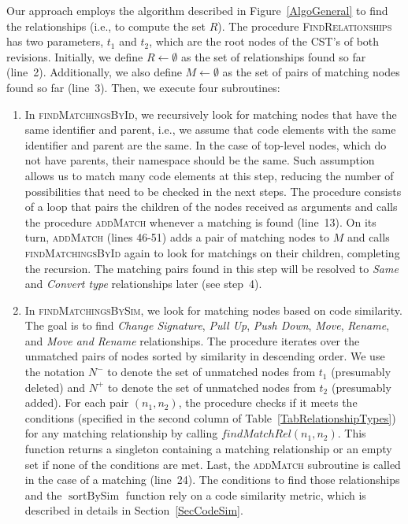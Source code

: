 \documentclass[10pt,journal,compsoc]{IEEEtran}
\DeclareMathOperator{\rdsortbysim}{sortBySim}
\begin{document}
Our approach employs the algorithm described in Figure~\ref{AlgoGeneral} to find the relationships (i.e., to compute the set $R$).
The procedure \textsc{FindRelationships} has two parameters, $t_1$ and $t_2$, which are the root nodes of the CST's of both revisions.
Initially, we define $R \gets \emptyset$ as the set of relationships found so far (line~2).
Additionally, we also define $M \gets \emptyset$ as the set of pairs of matching nodes found so far (line~3).
Then, we execute four subroutines:
\begin{enumerate}

\item In \textsc{findMatchingsById}, we recursively look for matching nodes that have the same identifier and parent, i.e., we assume that code elements with the same identifier and parent are the same. In the case of top-level nodes, which do not have parents, their namespace should be the same.
Such assumption allows us to match many code elements at this step, reducing the number of possibilities that need to be checked in the next steps.
The procedure consists of a loop that pairs the children of the nodes received as arguments and calls the procedure \textsc{addMatch} whenever a matching is found (line~13).
On its turn, \textsc{addMatch} (lines 46-51) adds a pair of matching nodes to $M$ and calls \textsc{findMatchingsById} again to look for matchings on their children, completing the recursion.
The matching pairs found in this step will be resolved to \textit{Same} and \textit{Convert type} relationships later (see step~4).

\item In \textsc{findMatchingsBySim}, we look for matching nodes based on code similarity.
The goal is to find \textit{Change Signature}, \textit{Pull Up}, \textit{Push Down}, \textit{Move}, \textit{Rename}, and \textit{Move and Rename} relationships.
The procedure iterates over the unmatched pairs of nodes sorted by similarity in descending order.
We use the notation $N^-$ to denote the set of unmatched nodes from $t_1$ (presumably deleted) and $N^+$ to denote the set of unmatched nodes from $t_2$ (presumably added).
For each pair $(n_1, n_2)$, the procedure checks if it meets the conditions (specified in the second column of Table~\ref{TabRelationshipTypes}) for any matching relationship by calling $\mathit{findMatchRel}(n_1, n_2)$.
This function returns a singleton containing a matching relationship or an empty set if none of the conditions are met.
Last, the \textsc{addMatch} subroutine is called in the case of a matching (line~24).
The conditions to find those relationships and the $\rdsortbysim$ function rely on a code similarity metric, which is described in details in Section~\ref{SecCodeSim}.


\end{enumerate}
\end{document}
